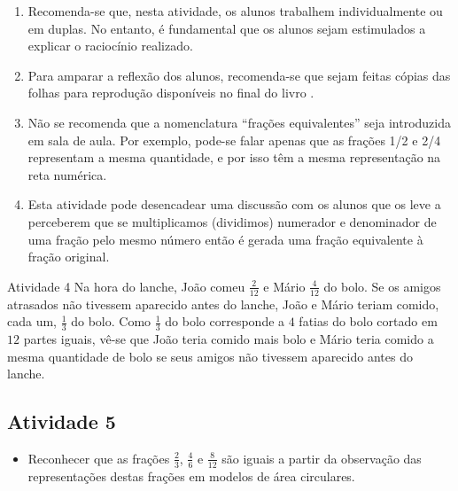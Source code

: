 \begin{multicols}{2}
\begin{enumerate} [\quad a)] %
    \item       Recomenda-se que, nesta atividade, os alunos trabalhem 
individualmente ou em duplas. No entanto, é fundamental que os alunos sejam 
estimulados a explicar o raciocínio realizado.
    \item       Para amparar a reflexão dos alunos, recomenda-se que sejam 
feitas cópias das             folhas para reprodução disponíveis no final do 
livro      .
    \item       Não se recomenda que a nomenclatura       ``frações 
equivalentes''       seja introduzida em sala de aula. Por exemplo, pode-se 
falar apenas que as frações 1/2 e 2/4 representam a mesma quantidade, e por isso 
têm a mesma representação na reta numérica.
    \item       Esta atividade pode desencadear uma discussão com os alunos que 
os leve a perceberem que se multiplicamos (dividimos) numerador e denominador de 
uma fração pelo mesmo número então é gerada uma fração equivalente à fração 
original.
\end{enumerate} %
  
\begin{resposta*}{Atividade 4}  
  Na hora do lanche, João comeu   $\frac{2}{12}$   e Mário   $\frac{4}{12}$   do 
bolo. Se os amigos atrasados não tivessem aparecido antes do lanche, João e 
Mário teriam comido, cada um,   $\frac{1}{3}$   do bolo. Como   $\frac{1}{3}$   
do bolo corresponde a   $4$   fatias do bolo cortado em   $12$   partes iguais, 
vê-se que João teria comido mais bolo e Mário teria comido a mesma quantidade de 
bolo se seus amigos não tivessem aparecido antes do lanche.  
\end{resposta*}

\Bg

\subsection{Atividade 5}

\begin{itemize} %
    \item       Reconhecer que as frações       $\frac{2}{3}$,       
$\frac{4}{6}$       e       $\frac{8}{12}$       são iguais a partir da 
observação das representações destas frações em modelos de área circulares. 
\end{itemize} %
  

\end{multicols}
